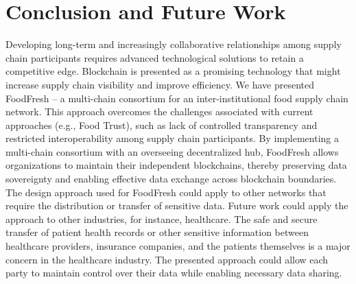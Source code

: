 \documentclass[conference]{iaria}
\begin{document}
\section{Conclusion and Future Work} \label{s:conclusion}
Developing long-term and increasingly collaborative relationships among supply chain participants requires advanced technological solutions to retain a competitive edge. Blockchain is presented as a promising technology that might increase supply chain visibility and improve efficiency.  We have presented FoodFresh -- a multi-chain consortium for an inter-institutional food supply chain network. 
This approach overcomes the challenges associated with current approaches (e.g.,  Food Trust), such as lack of controlled transparency and restricted interoperability among supply chain participants. By implementing a multi-chain consortium with an overseeing decentralized hub, FoodFresh allows organizations to maintain their independent blockchains, thereby preserving data sovereignty and enabling effective data exchange across blockchain boundaries. 
The design approach used for FoodFresh could apply to other networks that require the distribution or transfer of sensitive data. Future work could apply the approach to other industries, for instance, healthcare. The safe and secure transfer of patient health records or other sensitive information between healthcare providers, insurance companies, and the patients themselves is a major concern in the healthcare industry. The presented approach could allow each party to maintain control over their data while enabling necessary data sharing.


\begingroup
\sloppy
\printbibliography
\endgroup 
\end{document}
